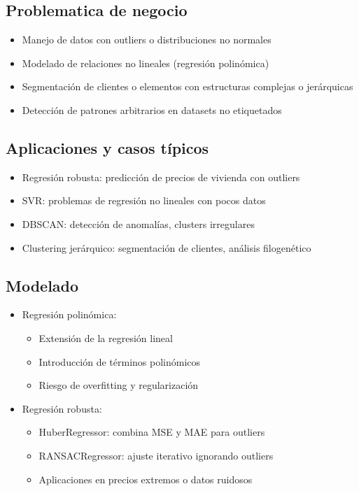 \documentclass[12pt,a4paper,openany,oneside]{book}
\begin{document}
\begin{itemize}
\subsection{Problematica de negocio}
\begin{itemize}
    \item Manejo de datos con outliers o distribuciones no normales
    \item Modelado de relaciones no lineales (regresión polinómica)
    \item Segmentación de clientes o elementos con estructuras complejas o jerárquicas
    \item Detección de patrones arbitrarios en datasets no etiquetados
\end{itemize}

\subsection{Aplicaciones y casos típicos}
\begin{itemize}
    \item Regresión robusta: predicción de precios de vivienda con outliers
    \item SVR: problemas de regresión no lineales con pocos datos
    \item DBSCAN: detección de anomalías, clusters irregulares
    \item Clustering jerárquico: segmentación de clientes, análisis filogenético
\end{itemize}

\subsection{Modelado}
\begin{itemize}
    \item Regresión polinómica:
    \begin{itemize}
        \item Extensión de la regresión lineal
        \item Introducción de términos polinómicos
        \item Riesgo de overfitting y regularización
    \end{itemize}

    \item Regresión robusta:
    \begin{itemize}
        \item HuberRegressor: combina MSE y MAE para outliers
        \item RANSACRegressor: ajuste iterativo ignorando outliers
        \item Aplicaciones en precios extremos o datos ruidosos
    \end{itemize}


\end{itemize}
\end{itemize}
\end{document}
